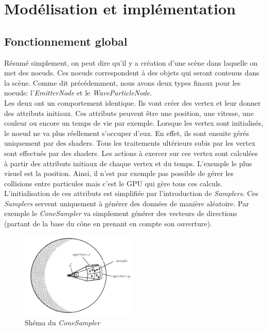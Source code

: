 \chapter{Modélisation et implémentation}

\section{Fonctionnement global}

Résumé simplement, on peut dire qu'il y a création d'une scène dans
laquelle on met des noeuds. Ces noeuds correspondent à des objets qui seront contenus
dans la scène. Comme dit précédemment, nous avons deux types finaux pour les noeuds:
l'\emph{EmitterNode} et le \emph{WaveParticleNode}. \\

Les deux ont un comportement identique. Ils vont créer des vertex et leur donner des
attributs initiaux. Ces attributs peuvent être une position, une vitesse, une couleur
ou encore un temps de vie par exemple. Lorsque les vertex sont initialisés, le noeud ne
va plus réellement s'occuper d'eux. En effet, ils sont ensuite gérés uniquement par des
shaders. Tous les traitements ultérieurs subis par les vertex sont effectués par des 
shaders. Les actions à exercer sur ces vertex sont calculées à partir des attributs initiaux
de chaque vertex et du temps. L'exemple le plus visuel est la position. Ainsi,
il n'est par exemple pas possible de gérer les collisions entre particules mais c'est le GPU qui gère
tous ces calculs.\\

L'initialisation de ces attributs est simplifiée par l'introduction de \emph{Samplers}.
Ces \emph{Samplers} servent uniquement à générer des données de manière aléatoire. Par exemple
le \emph{ConeSampler} va simplement générer des vecteurs de directions (partant de la base du cône
en prenant en compte son ouverture).

\begin{figure}[h]
	\begin{center}
		\includegraphics[width=0.5\textwidth]{img/conesampler.png}
	\end{center}
	\caption{Shéma du \emph{ConeSampler}}
\end{figure}

